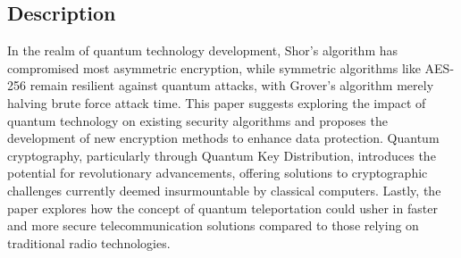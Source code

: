\documentclass{article}
\begin{document}
\subsection{Description}
In the realm of quantum technology development, Shor's algorithm has compromised most asymmetric encryption, while symmetric algorithms like AES-256 remain resilient against quantum attacks, with Grover's algorithm merely halving brute force attack time. This paper suggests exploring the impact of quantum technology on existing security algorithms and proposes the development of new encryption methods to enhance data protection. Quantum cryptography, particularly through Quantum Key Distribution, introduces the potential for revolutionary advancements, offering solutions to cryptographic challenges currently deemed insurmountable by classical computers. Lastly, the paper explores how the concept of quantum teleportation could usher in faster and more secure telecommunication solutions compared to those relying on traditional radio technologies.



\nocite{*} 

\printbibliography
\end{document}
